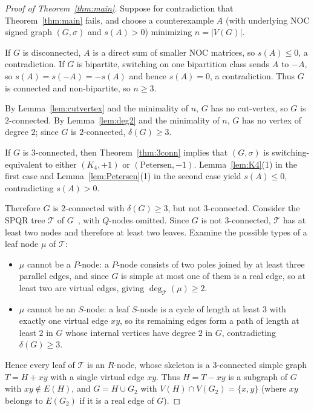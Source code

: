 \documentclass[10pt,letterpaper]{article}
\theoremstyle{zetaplain}
\theoremstyle{zetadef}
\theoremstyle{remark}
\numberwithin{equation}{section}
\begin{document}
\begin{proof}[Proof of Theorem~\ref{thm:main}]
Suppose for contradiction that Theorem~\ref{thm:main} fails, and choose a counterexample $A$ (with underlying NOC signed graph $(G, \sigma)$ and $s(A) > 0$) minimizing $n = |V(G)|$.

If $G$ is disconnected, $A$ is a direct sum of smaller NOC matrices, so $s(A) \le 0$, a contradiction. If $G$ is bipartite, switching on one bipartition class sends $A$ to $-A$, so $s(A) = s(-A) = -s(A)$ and hence $s(A) = 0$, a contradiction. Thus $G$ is connected and non-bipartite, so $n \ge 3$.

By Lemma~\ref{lem:cutvertex} and the minimality of $n$, $G$ has no cut-vertex, so $G$ is $2$-connected. By Lemma~\ref{lem:deg2} and the minimality of $n$, $G$ has no vertex of degree $2$; since $G$ is $2$-connected, $\delta(G) \ge 3$.

If $G$ is $3$-connected, then Theorem~\ref{thm:3conn} implies that $(G, \sigma)$ is switching-equivalent to either $(K_4, +1)$ or $(\mathrm{Petersen}, -1)$. Lemma~\ref{lem:K4}(1) in the first case and Lemma~\ref{lem:Petersen}(1) in the second case yield $s(A) \le 0$, contradicting $s(A) > 0$.

Therefore $G$ is $2$-connected with $\delta(G) \ge 3$, but not $3$-connected. Consider the SPQR tree $\mathcal{T}$ of $G$~\cite{Tut66,DT96}, with $Q$-nodes omitted. Since $G$ is not $3$-connected, $\mathcal{T}$ has at least two nodes and therefore at least two leaves. Examine the possible types of a leaf node $\mu$ of $\mathcal{T}$:
\begin{itemize}
  \item $\mu$ cannot be a $P$-node: a $P$-node consists of two poles joined by at least three parallel edges, and since $G$ is simple at most one of them is a real edge, so at least two are virtual edges, giving $\deg_{\mathcal{T}}(\mu) \ge 2$.
  \item $\mu$ cannot be an $S$-node: a leaf $S$-node is a cycle of length at least $3$ with exactly one virtual edge $xy$, so its remaining edges form a path of length at least $2$ in $G$ whose internal vertices have degree $2$ in $G$, contradicting $\delta(G) \ge 3$.
\end{itemize}
Hence every leaf of $\mathcal{T}$ is an $R$-node, whose skeleton is a $3$-connected simple graph $T = H + xy$ with a single virtual edge $xy$. Thus $H = T - xy$ is a subgraph of $G$ with $xy \notin E(H)$, and $G = H \cup G_2$ with $V(H) \cap V(G_2) = \{x, y\}$ (where $xy$ belongs to $E(G_2)$ if it is a real edge of $G$).


\end{proof}
\end{document}
